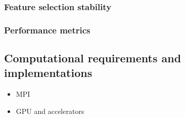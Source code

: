     \subsubsection{Feature selection stability}
    \subsubsection{Performance metrics}


  \subsection{Computational requirements and implementations} \label{subsec:implementation}
    \begin{itemize}
      \item MPI
      \item GPU and accelerators
    \end{itemize}
